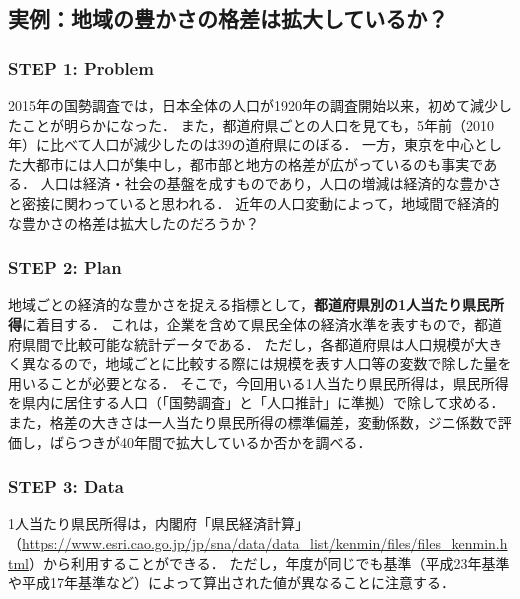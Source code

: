 \subsection{実例：地域の豊かさの格差は拡大しているか？}
%

\subsubsection*{STEP 1: Problem}
%
2015年の国勢調査では，日本全体の人口が1920年の調査開始以来，初めて減少したことが明らかになった．
%
また，都道府県ごとの人口を見ても，5年前（2010年）に比べて人口が減少したのは39の道府県にのぼる．
%
一方，東京を中心とした大都市には人口が集中し，都市部と地方の格差が広がっているのも事実である．
%
人口は経済・社会の基盤を成すものであり，人口の増減は経済的な豊かさと密接に関わっていると思われる．
%
近年の人口変動によって，地域間で経済的な豊かさの格差は拡大したのだろうか？
%

\subsubsection*{STEP 2: Plan}
%
地域ごとの経済的な豊かさを捉える指標として，\textbf{都道府県別の1人当たり県民所得}に着目する．
%
これは，企業を含めて県民全体の経済水準を表すもので，都道府県間で比較可能な統計データである．
%
ただし，各都道府県は人口規模が大きく異なるので，地域ごとに比較する際には規模を表す人口等の変数で除した量を用いることが必要となる．
%
そこで，今回用いる1人当たり県民所得は，県民所得を県内に居住する人口（「国勢調査」と「人口推計」に準拠）で除して求める．
%
また，格差の大きさは一人当たり県民所得の標準偏差，変動係数，ジニ係数で評価し，ばらつきが40年間で拡大しているか否かを調べる．
%

\subsubsection*{STEP 3: Data}
%
1人当たり県民所得は，内閣府「県民経済計算」（\url{https://www.esri.cao.go.jp/jp/sna/data/data_list/kenmin/files/files_kenmin.html}）から利用することができる．
%
ただし，年度が同じでも基準（平成23年基準や平成17年基準など）によって算出された値が異なることに注意する．
%
%
%

